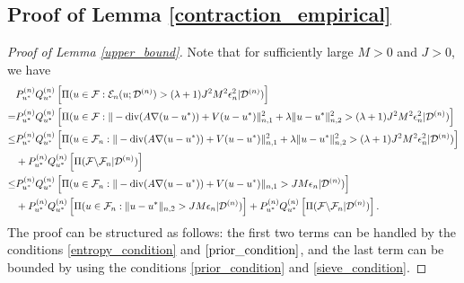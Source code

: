 \documentclass{article}
\newcommand{\F}{\mathcal{F}}
\newcommand{\D}{\mathcal{D}}
\renewcommand{\div}{\textnormal{div}}
\theoremstyle{plain}
\theoremstyle{definition}
\theoremstyle{remark}
\begin{document}
\subsection{Proof of Lemma \ref{contraction_empirical}} \label{proof_contraction_empirical}
\begin{proof}[Proof of Lemma \ref{upper_bound}]
    Note that for sufficiently large $M > 0$ and $J > 0$, we have
    \begin{equation} \label{contraction_empirical_errordecomposition}
    \begin{aligned}
        & P_{u^*}^{(n)} Q_{u^*}^{(n)} \left[\Pi(u \in \F: \mathcal{E}_n(u; \D^{(n)}) > (\lambda + 1) J^2 M^2 \epsilon_n^2 | \D^{(n)} )\right] \\
        = &  P_{u^*}^{(n)} Q_{u^*}^{(n)} \left[\Pi(u \in \F: \|-\div (A \nabla (u - u^*)) + V(u - u^*) \|_{n, 1}^2 + \lambda \|u - u^*\|_{n, 2}^2 > (\lambda + 1) J^2 M^2 \epsilon_n^2 | \D^{(n)} )\right] \\
        \leq & P_{u^*}^{(n)} Q_{u^*}^{(n)} \left[\Pi(u \in \F_n: \|-\div (A \nabla(u - u^*)) + V(u - u^*) \|_{n, 1}^2 + \lambda \|u - u^*\|_{n, 2}^2 > (\lambda + 1) J^2 M^2 \epsilon_{n}^2 | \D^{(n)} )\right] \\ & + P_{u^*}^{(n)} Q_{u^*}^{(n)} \left[\Pi(\F \backslash \F_n | \D^{(n)} )\right]  \\ \leq & P_{u^*}^{(n)} Q_{u^*}^{(n)} \left[\Pi(u \in \F_n: \|-\div (A \nabla (u - u^*)) + V(u - u^*) \|_{n, 1} >  J M \epsilon_n | \D^{(n)} )\right] \\ & + P_{u^*}^{(n)} Q_{u^*}^{(n)} \left[\Pi(u \in \F_n:  \|u - u^*\|_{n, 2} >  J M \epsilon_n | \D^{(n)} )\right] + P_{u^*}^{(n)} Q_{u^*}^{(n)} \left[\Pi(\F \backslash \F_n | \D^{(n)} )\right]. 
    \end{aligned}
    \end{equation}
    The proof can be structured as follows: the first two terms can be handled by the conditions \eqref{entropy_condition} and $\eqref{prior_condition}$, and the last term can be bounded by using the conditions \eqref{prior_condition} and \eqref{sieve_condition}. 


\end{proof}
\end{document}
